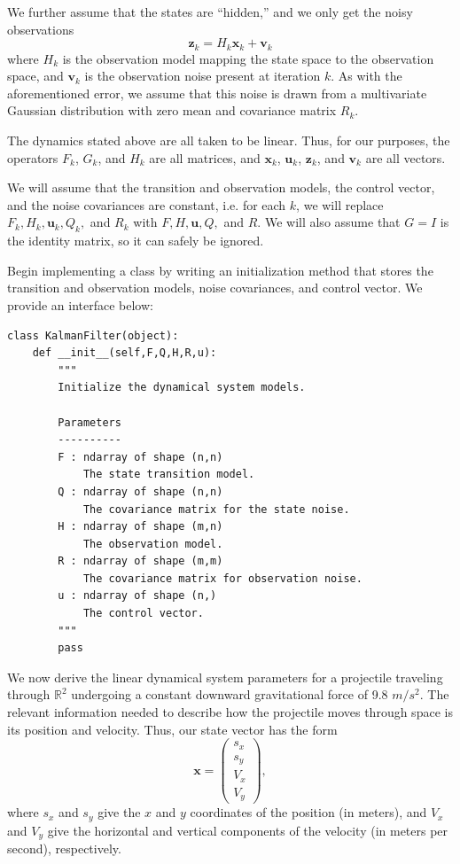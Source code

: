 We further assume that the states are ``hidden,'' and we only get the noisy observations
\begin{equation}
\mathbf{z}_{k} = H_{k}\mathbf{x}_{k} + \mathbf{v}_{k}
\label{eq:obs}
\end{equation}
where $H_{k}$ is the observation model mapping the state space to the observation space, and $\mathbf{v}_{k}$ is the observation noise present at iteration $k$.
As with the aforementioned error, we assume that this noise is drawn from a multivariate Gaussian distribution with zero mean and covariance matrix $R_{k}$.

The dynamics stated above are all taken to be linear.
Thus, for our purposes, the operators $F_k$, $G_k$, and $H_k$ are all matrices, and $\mathbf{x}_k$, $\mathbf{u}_k$, $\mathbf{z}_k$, and $\mathbf{v}_k$ are all vectors.

We will assume that the transition and observation models, the control vector, and the noise covariances are constant, i.e. for each $k$, we will replace $F_{k}, H_k, \mathbf{u}_{k}, Q_{k},$ and $R_{k}$ with $F, H, \mathbf{u}, Q,$ and $R$.
We will also assume that $G = I$ is the identity matrix, so it can safely be ignored.

\begin{problem}
Begin implementing a  class by writing an initialization method that stores the transition and observation models, noise covariances, and control vector.
We provide an interface below:
\begin{lstlisting}
class KalmanFilter(object):
    def __init__(self,F,Q,H,R,u):
        """
        Initialize the dynamical system models.

        Parameters
        ----------
        F : ndarray of shape (n,n)
            The state transition model.
        Q : ndarray of shape (n,n)
            The covariance matrix for the state noise.
        H : ndarray of shape (m,n)
            The observation model.
        R : ndarray of shape (m,m)
            The covariance matrix for observation noise.
        u : ndarray of shape (n,)
            The control vector.
        """
        pass
\end{lstlisting}
\end{problem}

We now derive the linear dynamical system parameters for a projectile traveling through $\mathbb{R}^2$ undergoing a constant downward gravitational force of 9.8 $m/s^2$.
The relevant information needed to describe how the projectile moves through space is its position and velocity.
Thus, our state vector has the form
\[
\mathbf{x} = \left( \begin{array}{c} s_{x} \\ s_{y} \\ V_{x} \\ V_{y} \end{array} \right),
\]
where $s_x$ and $s_y$ give the $x$ and $y$ coordinates of the position (in meters), and $V_x$ and $V_y$ give the horizontal and vertical components of the velocity (in meters per second), respectively.

